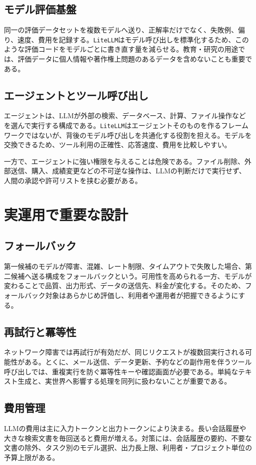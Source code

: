 \documentclass[11pt,a4paper]{bxjsarticle}
\newcommand{\litellm}{\texttt{LiteLLM}}
\begin{document}
\subsection{モデル評価基盤}
同一の評価データセットを複数モデルへ送り、正解率だけでなく、失敗例、偏り、速度、費用を記録する。\litellm{}はモデル呼び出しを標準化するため、このような評価コードをモデルごとに書き直す量を減らせる。教育・研究の用途では、評価データに個人情報や著作権上問題のあるデータを含めないことも重要である。

\subsection{エージェントとツール呼び出し}
エージェントは、LLMが外部の検索、データベース、計算、ファイル操作などを選んで実行する構成である。\litellm{}はエージェントそのものを作るフレームワークではないが、背後のモデル呼び出しを共通化する役割を担える。モデルを交換できるため、ツール利用の正確性、応答速度、費用を比較しやすい。

一方で、エージェントに強い権限を与えることは危険である。ファイル削除、外部送信、購入、成績変更などの不可逆な操作は、LLMの判断だけで実行せず、人間の承認や許可リストを挟む必要がある。

\section{実運用で重要な設計}
\subsection{フォールバック}
第一候補のモデルが障害、混雑、レート制限、タイムアウトで失敗した場合、第二候補へ送る構成をフォールバックという。可用性を高められる一方、モデルが変わることで品質、出力形式、データの送信先、料金が変化する。そのため、フォールバック対象はあらかじめ評価し、利用者や運用者が把握できるようにする。

\subsection{再試行と冪等性}
ネットワーク障害では再試行が有効だが、同じリクエストが複数回実行される可能性がある。とくに、メール送信、データ更新、予約などの副作用を伴うツール呼び出しでは、重複実行を防ぐ冪等性キーや確認画面が必要である。単純なテキスト生成と、実世界へ影響する処理を同列に扱わないことが重要である。

\subsection{費用管理}
LLMの費用は主に入力トークンと出力トークンにより決まる。長い会話履歴や大きな検索文書を毎回送ると費用が増える。対策には、会話履歴の要約、不要な文書の除外、タスク別のモデル選択、出力長上限、利用者・プロジェクト単位の予算上限がある。
\end{document}
